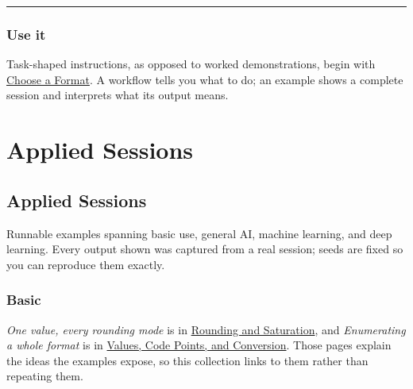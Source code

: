 {\rule{\textwidth}{1pt}}


\subsection{Use it}



\label{7476714143305412830-dup1}{}


Task-shaped instructions, as opposed to worked demonstrations, begin with \href{workflow\_\allowbreak{}choose\_\allowbreak{}format.md}{Choose a Format}. A workflow tells you what to do; an example shows a complete session and interprets what its output means.



\chapter{Applied Sessions}


\section{Applied Sessions}



\label{1143608952680747135}{}


Runnable examples spanning basic use, general AI, machine learning, and deep learning. Every output shown was captured from a real session; seeds are fixed so you can reproduce them exactly.



\subsection{Basic}



\label{13551325986707881962-dup1}{}


\begin{tcolorbox}[toptitle=-1mm,bottomtitle=1mm,colback=admonition-note!50!white,colframe=admonition-note,title=\textbf{Two foundational examples live with their explanations}]
\emph{One value, every rounding mode} is in \href{concept\_\allowbreak{}rounding\_\allowbreak{}saturation.md}{Rounding and Saturation}, and \emph{Enumerating a whole format} is in \href{concept\_\allowbreak{}values\_\allowbreak{}codepoints.md}{Values, Code Points, and Conversion}. Those pages explain the ideas the examples expose, so this collection links to them rather than repeating them.

\end{tcolorbox}


